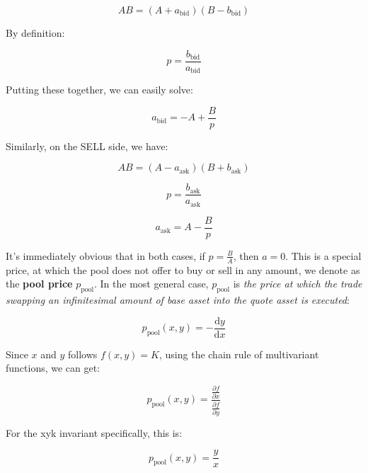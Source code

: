 \documentclass{article}
\begin{document}
\begin{equation}
  A B = (A + a_{\mathrm{bid}}) (B - b_{\mathrm{bid}})
\end{equation}

By definition:

\begin{equation}
  p = \frac{b_{\mathrm{bid}}}{a_{\mathrm{bid}}}
\end{equation}

Putting these together, we can easily solve:

\begin{equation}
  a_{\mathrm{bid}} = -A + \frac{B}{p}
\end{equation}

Similarly, on the SELL side, we have:

\begin{equation}
  A B = (A - a_{\mathrm{ask}}) (B + b_{\mathrm{ask}})
\end{equation}

\begin{equation}
  p = \frac{b_{\mathrm{ask}}}{a_{\mathrm{ask}}}
\end{equation}

\begin{equation}
  a_{\mathrm{ask}} = A - \frac{B}{p}
\end{equation}

It's immediately obvious that in both cases, if $p = \frac{B}{A}$, then $a = 0$. This is a special price, at which the pool does not offer to buy or sell in any amount, we denote as the \textbf{pool price} $p_{\mathrm{pool}}$. In the most general case, $p_{\mathrm{pool}}$ is \textit{the price at which the trade swapping an infinitesimal amount of base asset into the quote asset is executed}:

\begin{equation}
  p_{\mathrm{pool}}(x, y) = - \frac{\mathrm{d}y}{\mathrm{d}x}
\end{equation}

Since $x$ and $y$ follows $f(x, y) = K$, using the chain rule of multivariant functions, we can get:

\begin{equation}
  p_{\mathrm{pool}}(x, y) = \frac{\frac{\partial f}{\partial x}}{\frac{\partial f}{\partial y}}
\end{equation}

For the xyk invariant specifically, this is:

\begin{equation}
  p_{\mathrm{pool}}(x, y) = \frac{y}{x}
\end{equation}
\end{document}
